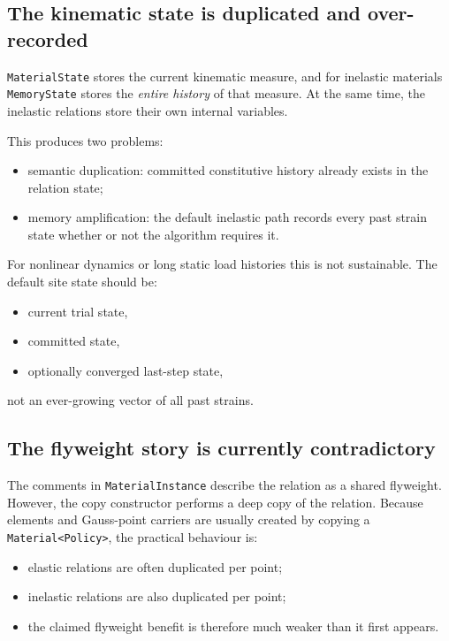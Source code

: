 \subsection{The kinematic state is duplicated and over-recorded}

\texttt{MaterialState} stores the current kinematic measure, and for inelastic
materials \texttt{MemoryState} stores the \emph{entire history} of that measure.
At the same time, the inelastic relations store their own internal variables.

This produces two problems:
\begin{itemize}
  \item semantic duplication: committed constitutive history already exists in
        the relation state;
  \item memory amplification: the default inelastic path records every past
        strain state whether or not the algorithm requires it.
\end{itemize}

For nonlinear dynamics or long static load histories this is not sustainable.
The default site state should be:
\begin{itemize}
  \item current trial state,
  \item committed state,
  \item optionally converged last-step state,
\end{itemize}
not an ever-growing vector of all past strains.

\subsection{The flyweight story is currently contradictory}

The comments in \texttt{MaterialInstance} describe the relation as a shared
flyweight.  However, the copy constructor performs a deep copy of the relation.
Because elements and Gauss-point carriers are usually created by copying a
\texttt{Material<Policy>}, the practical behaviour is:
\begin{itemize}
  \item elastic relations are often duplicated per point;
  \item inelastic relations are also duplicated per point;
  \item the claimed flyweight benefit is therefore much weaker than it first
        appears.
\end{itemize}


